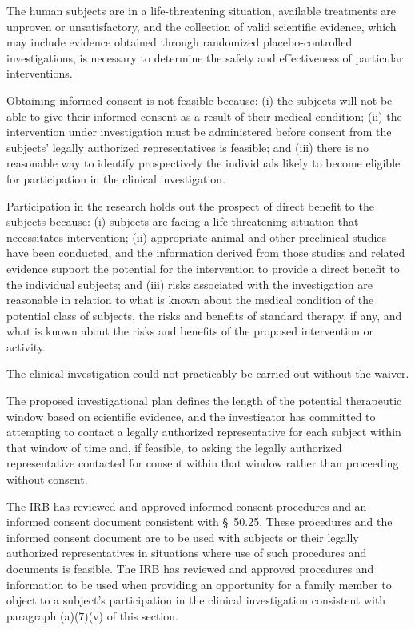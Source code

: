 \documentclass[11pt]{article}
\begin{document}
\begin{description}[leftmargin=1.0cm,style=sameline]
\item[(1)] The human subjects are in a life-threatening situation, available treatments are unproven or unsatisfactory, and the collection of valid scientific evidence, which may include evidence obtained through randomized placebo-controlled investigations, is necessary to determine the safety and effectiveness of particular interventions.

\item[(2)] Obtaining informed consent is not feasible because: (i) the subjects will not be able to give their informed consent as a result of their medical condition; (ii) the intervention under investigation must be administered before consent from the subjects' legally authorized representatives is feasible; and (iii) there is no reasonable way to identify prospectively the individuals likely to become eligible for participation in the clinical investigation.

\item[(3)] Participation in the research holds out the prospect of direct benefit to the subjects because: (i) subjects are facing a life-threatening situation that necessitates intervention; (ii) appropriate animal and other preclinical studies have been conducted, and the information derived from those studies and related evidence support the potential for the intervention to provide a direct benefit to the individual subjects; and (iii) risks associated with the investigation are reasonable in relation to what is known about the medical condition of the potential class of subjects, the risks and benefits of standard therapy, if any, and what is known about the risks and benefits of the proposed intervention or activity.

\item[(4)] The clinical investigation could not practicably be carried out without the waiver.

\item[(5)] The proposed investigational plan defines the length of the potential therapeutic window based on scientific evidence, and the investigator has committed to attempting to contact a legally authorized representative for each subject within that window of time and, if feasible, to asking the legally authorized representative contacted for consent within that window rather than proceeding without consent.

\item[(6)] The IRB has reviewed and approved informed consent procedures and an informed consent document consistent with \S~50.25. These procedures and the informed consent document are to be used with subjects or their legally authorized representatives in situations where use of such procedures and documents is feasible. The IRB has reviewed and approved procedures and information to be used when providing an opportunity for a family member to object to a subject's participation in the clinical investigation consistent with paragraph (a)(7)(v) of this section.


\end{description}
\end{document}
